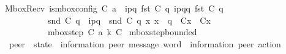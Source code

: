 \begin{isabellebody}
\ \ MboxRecv{\isacharcolon}{\kern0pt}\ {\isachardoublequoteopen}{\isasymlbrakk}is{\isacharunderscore}{\kern0pt}mbox{\isacharunderscore}{\kern0pt}config\ C{}{\isacharsemicolon}{\kern0pt}\ a\ {\isacharequal}{\kern0pt}\ {\isacharquery}{\kern0pt}{\isasymlangle}{\isacharparenleft}{\kern0pt}i\isactrlbsup p{\isasymrightarrow}q\isactrlesup {\isacharparenright}{\kern0pt}{\isasymrangle}{\isacharsemicolon}{\kern0pt}\ fst\ {\isacharparenleft}{\kern0pt}C{}\ q{\isacharparenright}{\kern0pt}\ {\isasymmidarrow}{\isacharquery}{\kern0pt}{\isasymlangle}{\isacharparenleft}{\kern0pt}i\isactrlbsup p{\isasymrightarrow}q\isactrlesup {\isacharparenright}{\kern0pt}{\isasymrangle}{\isasymrightarrow}\isactrlsub {\isasymC}q\ {\isacharparenleft}{\kern0pt}fst\ {\isacharparenleft}{\kern0pt}C{}\ q{\isacharparenright}{\kern0pt}{\isacharparenright}{\kern0pt}{\isacharsemicolon}{\kern0pt}\isanewline
\ \ \ \ \ \ \ \ \ \ \ \ {\isacharparenleft}{\kern0pt}snd\ {\isacharparenleft}{\kern0pt}C{}\ q{\isacharparenright}{\kern0pt}{\isacharparenright}{\kern0pt}\ {\isacharequal}{\kern0pt}\ {\isacharbrackleft}{\kern0pt}{\isacharparenleft}{\kern0pt}i\isactrlbsup p{\isasymrightarrow}q\isactrlesup {\isacharparenright}{\kern0pt}{\isacharbrackright}{\kern0pt}\ {\isasymsqdot}\ snd\ {\isacharparenleft}{\kern0pt}C{}\ q{\isacharparenright}{\kern0pt}{\isacharsemicolon}{\kern0pt}\ {\isasymforall}x{\isachardot}{\kern0pt}\ x\ {\isasymnoteq}\ q\ {\isasymlongrightarrow}\ C{}{\isacharparenleft}{\kern0pt}x{\isacharparenright}{\kern0pt}\ {\isacharequal}{\kern0pt}\ C{}{\isacharparenleft}{\kern0pt}x{\isacharparenright}{\kern0pt}{\isasymrbrakk}\ {\isasymLongrightarrow}\isanewline
\ \ \ \ \ \ \ \ \ \ \ \ mbox{\isacharunderscore}{\kern0pt}step\ C{}\ a\ k\ C{}{\isachardoublequoteclose}\isanewline
\isanewline
{}\isamarkupfalse%
\ mbox{\isacharunderscore}{\kern0pt}step{\isacharunderscore}{\kern0pt}bounded\isanewline
\ \ {\isacharcolon}{\kern0pt}{\isacharcolon}{\kern0pt}\ {\isachardoublequoteopen}{\isacharparenleft}{\kern0pt}{\isacharprime}{\kern0pt}peer\ {\isasymRightarrow}\ {\isacharparenleft}{\kern0pt}{\isacharprime}{\kern0pt}state\ {\isasymtimes}\ {\isacharparenleft}{\kern0pt}{\isacharprime}{\kern0pt}information{\isacharcomma}{\kern0pt}\ {\isacharprime}{\kern0pt}peer{\isacharparenright}{\kern0pt}\ message\ word{\isacharparenright}{\kern0pt}{\isacharparenright}{\kern0pt}\ {\isasymRightarrow}\ {\isacharparenleft}{\kern0pt}{\isacharprime}{\kern0pt}information{\isacharcomma}{\kern0pt}\ {\isacharprime}{\kern0pt}peer{\isacharparenright}{\kern0pt}\ action\ {\isasymRightarrow}\isanewline

\end{isabellebody}
